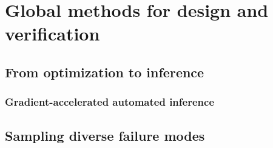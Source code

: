 
\section{Global methods for design and verification}\label{section:global_methods}





\subsection{From optimization to inference}




\subsubsection{Gradient-accelerated automated inference}



\subsection{Sampling diverse failure modes}



